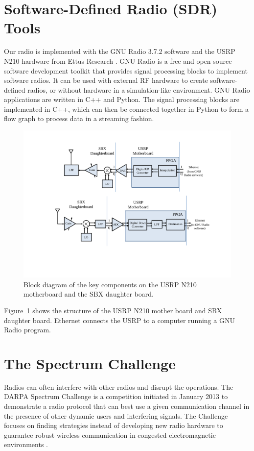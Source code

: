 \section{Software-Defined Radio (SDR) Tools}
Our radio is implemented with the GNU Radio 3.7.2 software \cite{GNURadio} and the USRP N210 hardware from Ettus Research \cite{EttusResearch}. GNU Radio is a free and open-source software development toolkit that provides signal processing blocks to implement software radios. It can be used with external RF hardware to create software-defined radios, or without hardware in a simulation-like environment. GNU Radio applications are written in C++ and Python. The signal processing blocks are implemented in C++, which can then be connected together in Python to form a flow graph to process data in a streaming fashion.
\begin{figure}[tpb]
  \begin{center}
    \centerline{\includegraphics[width=180mm]{USRPandSBX.pdf}}
    \caption{Block diagram of the key components on the USRP N210 motherboard and the SBX daughter board.}
    \label{fig:USRPandSBX}
  \end{center}
\end{figure}


Figure~\ref{fig:USRPandSBX} shows the structure of the USRP N210 mother board and SBX daughter board. Ethernet connects the USRP to a computer running a GNU Radio program.


\section{The Spectrum Challenge}
Radios can often interfere with other radios and disrupt the operations. The DARPA Spectrum Challenge is a competition initiated in January 2013 to demonstrate a radio protocol that can best use a given communication channel in the presence of other dynamic users and interfering signals. The Challenge focuses on finding strategies instead of developing new radio hardware to guarantee robust wireless communication in congested electromagnetic environments \cite{DARPASpectrumChallenge}.

